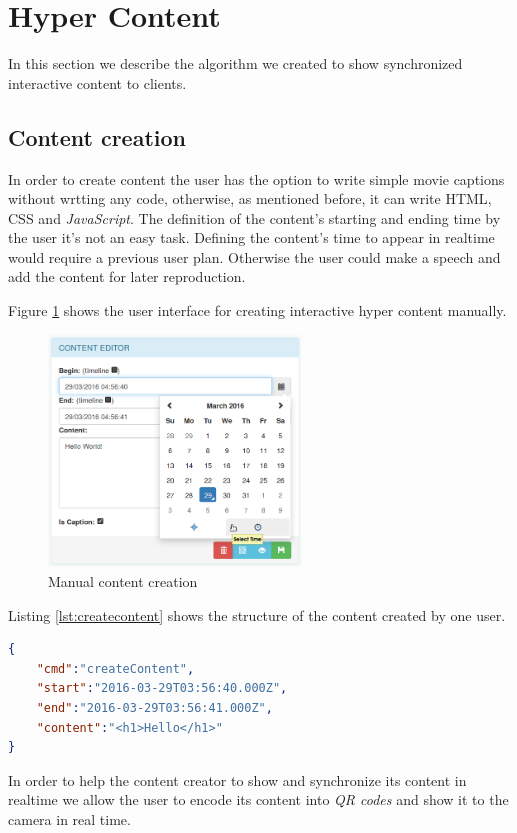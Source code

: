 \section{Hyper Content}
	In this section we describe the algorithm we created to show synchronized interactive content to clients.



	\subsection{Content creation}

	In order to create content the user has the option to write simple movie captions without wrtting any code, otherwise, as mentioned before, it can write \ac{HTML}, \ac{CSS} and \emph{JavaScript}. The definition of the content's starting and ending time by the user it's not an easy task. Defining the content's time to appear in realtime would require a previous user plan. Otherwise the user could make a speech and add the content for later reproduction.

	Figure \ref{fig:creation} shows the user interface for creating interactive hyper content manually.

	\begin{figure}[H]
		\centering
		\includegraphics[width=0.6\textwidth]{figures/edition.png}
		\caption{Manual content creation}
		\label{fig:creation}
	\end{figure}


	Listing \ref{lst:createcontent} shows the structure of the content created by one user.

\begin{minipage}{\linewidth}
\begin{lstlisting}[caption={Exampe of content created by one user},label={lst:createcontent},language=json]
{
	"cmd":"createContent",
	"start":"2016-03-29T03:56:40.000Z",
	"end":"2016-03-29T03:56:41.000Z",
	"content":"<h1>Hello</h1>"
}
\end{lstlisting}
\end{minipage}
	In order to help the content creator to show and synchronize its content in realtime we allow the user to encode its content into \emph{QR codes} and show it to the camera in real time.

